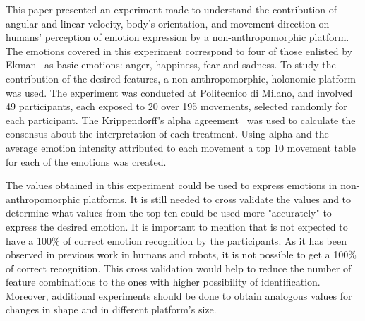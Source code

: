 This paper presented an experiment made to understand the contribution of angular and linear velocity, body's orientation, and movement direction on humans' perception of emotion expression by a non-anthropomorphic platform. The emotions covered in this experiment correspond to four of those enlisted by Ekman~\cite{Ekman2001} as basic emotions: anger, happiness, fear and sadness. To study the contribution of the desired features, a non-anthropomorphic, holonomic platform was used. The experiment was conducted at Politecnico di Milano, and involved 49 participants, each exposed to 20 over 195 movements, selected randomly for each participant. The Krippendorff's alpha agreement~\cite{Krippendorff2007} was used to calculate the consensus about the interpretation of each treatment. Using  alpha and the average emotion intensity attributed to each movement a top 10 movement table for each of the emotions was created.

The values obtained in this experiment could be used to express emotions in non-anthropomorphic platforms. It is still needed to cross validate the values and to determine what values from the top ten could be used more "accurately" to express the desired emotion. It is important to mention that is not expected to have a 100\% of correct emotion recognition by the participants. As it has been observed in previous work in humans and robots, it is not possible to get a 100\% of correct recognition. This cross validation would help to reduce the number of feature combinations to the ones with higher possibility of identification. Moreover, additional experiments should be done to obtain analogous values for changes in shape and in different platform's size. 
